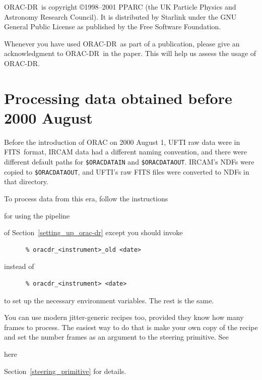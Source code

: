 \documentclass[twoside,11pt]{article}
\newcommand{\htmladdnormallink}[2]{#1}
\newcommand{\htmlref}[2]{#1}
\newenvironment{latexonly}{}{}
\newcommand{\xlabel}[1]{}
\renewcommand{\_}{\texttt{\symbol{95}}}
\newcommand{\ORACDR}{{\footnotesize ORAC-DR}}
\newcommand{\FITSref}{\htmladdnormallink{FITS}{http://fits.gsfc.nasa.gov/}}
\begin{document}
\ORACDR\ is copyright \copyright 1998--2001 PPARC (the UK Particle Physics
and Astronomy Research Council).  It is distributed by Starlink
under the GNU General Public License as published by the Free Software
Foundation.

Whenever you have used \ORACDR\ as part of a publication, please give
an acknowledgment to \ORACDR\ in the paper.  This will help us assess
the usage of \ORACDR.

\newpage
\appendix
\section{\xlabel{processing_data_obtained_before_2000_august}Processing data obtained before 2000 August\label{
processing_data_obtained_before_2000_august}}%

Before the introduction of
\htmladdnormallink{ORAC}{http://www.stsci.edu/stsci/meetings/adassVII/bridgera.html}
on 2000 August 1, UFTI raw data were in \FITSref\ format, IRCAM data had a
different naming convention, and there were different default paths for
{\tt\$ORAC\_DATA\_IN} and {\tt\$ORAC\_DATA\_OUT}.  IRCAM's NDFs were
copied to {\tt \$ORAC\_DATA\_OUT}, and UFTI's raw FITS files were
converted to NDFs in that directory.

To process data from this era, follow the instructions 
\begin{htmlonly}
\htmlref{for using the pipeline}{setting_up_orac-dr}
\end{htmlonly}
\begin{latexonly}
of Section~\ref{setting_up_orac-dr}
\end{latexonly}
except you should invoke 
\begin{verbatim}
      % oracdr_<instrument>_old <date>
\end{verbatim}
instead of
\begin{verbatim}
      % oracdr_<instrument> <date>
\end{verbatim}
to set up the necessary environment variables.  The rest is the same.

You can use modern jitter-generic recipes too, provided they know how
many frames to process.  The easiest way to do that is make your own
copy of the recipe and set the number frames as an argument to the
steering primitive.  See
\begin{htmlonly}
\htmlref{here}{steering_primitive}
\end{htmlonly}
\begin{latexonly}
Section~\ref{steering_primitive}
\end{latexonly}
for details.
\end{document}
